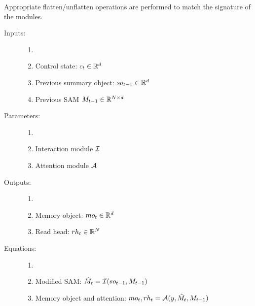 \begin{note}
	Appropriate flatten/unflatten operations are performed to match the signature 
	of the modules.
\end{note}




\begin{description}
	\item[Inputs:] 
	\begin{enumerate}
		\item[]
		\item Control state: $c_t \in \mathbb{R}^d$	
		\item Previous summary object: $so_{t-1} \in  \mathbb{R}^d$
		\item Previous SAM $M_{t-1} \in \mathbb{R}^{N \times d}$
	\end{enumerate}
	
	\item[Parameters:] 
	\begin{enumerate}
		\item[]
		\item Interaction module $\mathcal{I}$
		\item Attention module $\mathcal{A}$
	\end{enumerate}
	
	\item[Outputs:] 
	\begin{enumerate}
		\item[]
		\item Memory object: $mo_t \in \mathbb{R}^d$
		\item Read head: $rh_t \in \mathbb{R}^N$
	\end{enumerate}
	
	\item[Equations:]
	\begin{enumerate}
		\item[]
		\item Modified SAM: $\hat{M}_t = \mathcal{I}(so_{t-1}, M_{t-1})$
		\item Memory object and attention: $mo_t, rh_t = \mathcal{A}(y, \hat{M}_t, M_{t-1})$
	\end{enumerate}
\end{description}



